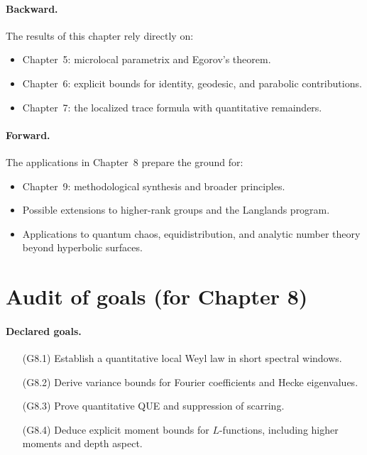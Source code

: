 \paragraph{Backward.}  
The results of this chapter rely directly on:
\begin{itemize}
\item Chapter~5: microlocal parametrix and Egorov’s theorem.  
\item Chapter~6: explicit bounds for identity, geodesic, and parabolic contributions.  
\item Chapter~7: the localized trace formula with quantitative remainders.
\end{itemize}

\paragraph{Forward.}  
The applications in Chapter~8 prepare the ground for:
\begin{itemize}
\item Chapter~9: methodological synthesis and broader principles.  
\item Possible extensions to higher-rank groups and the Langlands program.  
\item Applications to quantum chaos, equidistribution, and analytic number theory beyond hyperbolic surfaces.
\end{itemize}

\section{Audit of goals (for Chapter 8)}

\paragraph{Declared goals.}
\begin{itemize}
\item[(G8.1)] Establish a quantitative local Weyl law in short spectral windows.  
\item[(G8.2)] Derive variance bounds for Fourier coefficients and Hecke eigenvalues.  
\item[(G8.3)] Prove quantitative QUE and suppression of scarring.  
\item[(G8.4)] Deduce explicit moment bounds for $L$-functions, including higher moments and depth aspect.  
\end{itemize}

